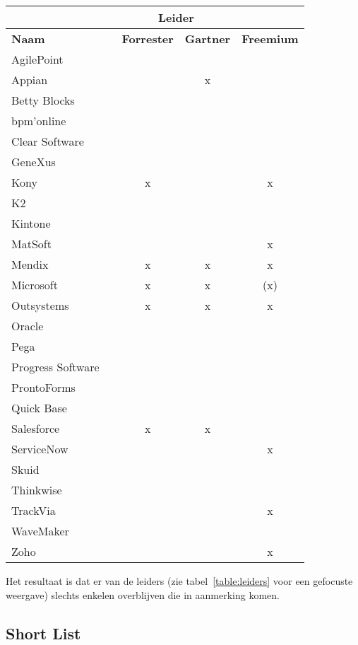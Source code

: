 \begin{longtable}{llccc}
    \textbf{} & \textbf{} & \multicolumn{2}{c}{\textbf{Leider}} & \multicolumn{1}{l}{\textbf{}} \\
    \endfirsthead
    \endhead
    \textbf{Naam} &  & \multicolumn{1}{l}{\textbf{Forrester}} & \multicolumn{1}{l}{\textbf{Gartner}} & \multicolumn{1}{l}{\textbf{Freemium}} \\
    AgilePoint &  &  &  &  \\
    Appian &  &  & x &  \\
    Betty Blocks &  &  &  &  \\
    bpm'online &  &  &  &  \\
    Clear Software &  &  &  &  \\
    GeneXus &  &  &  &  \\
    Kony &  & x &  & x \\
    K2 &  &  &  &  \\
    Kintone &  &  &  &  \\
    MatSoft &  &  &  & x \\
    Mendix &  & x & x & x \\
    Microsoft &  & x & x & (x) \\
    Outsystems &  & x & x & x \\
    Oracle &  &  &  &  \\
    Pega &  &  &  &  \\
    Progress Software &  &  &  &  \\
    ProntoForms &  &  &  &  \\
    Quick Base &  &  &  &  \\
    Salesforce &  & x & x &  \\
    ServiceNow &  &  &  & x \\
    Skuid &  &  &  &  \\
    Thinkwise &  &  &  &  \\
    TrackVia &  &  &  & x \\
    WaveMaker &  &  &  &  \\
    Zoho &  &  &  & x
\end{longtable}

Het resultaat is dat er van de leiders (zie tabel~\ref{table:leiders} voor een gefocuste weergave) slechts enkelen overblijven die in aanmerking komen.

\subsection{Short List}

